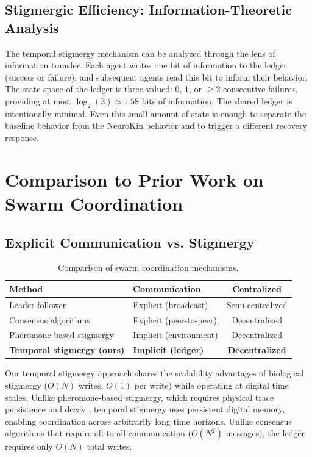 \documentclass[12pt,a4paper,oneside]{report}
\begin{document}
\subsection{Stigmergic Efficiency: Information-Theoretic Analysis}

The temporal stigmergy mechanism can be analyzed through the lens of information transfer. Each agent writes one bit of information to the ledger (success or failure), and subsequent agents read this bit to inform their behavior. The state space of the ledger is three-valued: 0, 1, or $\geq$2 consecutive failures, providing at most $\log_2(3) \approx 1.58$ bits of information. The shared ledger is intentionally minimal. Even this small amount of state is enough to separate the baseline behavior from the NeuroKin behavior and to trigger a different recovery response.

\section{Comparison to Prior Work on Swarm Coordination}

\subsection{Explicit Communication vs. Stigmergy}

\begin{table}[H]
\centering
\caption{Comparison of swarm coordination mechanisms.}
\label{tab:swarm_comparison_lit}
\small
\begin{tabular}{p{5.0cm}p{5.0cm}c}
\toprule
\textbf{Method} & \textbf{Communication} & \textbf{Centralized} \\
\midrule
Leader-follower & Explicit (broadcast) & Semi-centralized \\
Consensus algorithms & Explicit (peer-to-peer) & Decentralized \\
Pheromone-based stigmergy & Implicit (environment) & Decentralized \\
\textbf{Temporal stigmergy (ours)} & \textbf{Implicit (ledger)} & \textbf{Decentralized} \\
\bottomrule
\end{tabular}
\end{table}

Our temporal stigmergy approach shares the scalability advantages of biological stigmergy ($O(N)$ writes, $O(1)$ per write) while operating at digital time scales. Unlike pheromone-based stigmergy, which requires physical trace persistence and decay \cite{bongard2006resilient}, temporal stigmergy uses persistent digital memory, enabling coordination across arbitrarily long time horizons. Unlike consensus algorithms that require all-to-all communication ($O(N^2)$ messages), the ledger requires only $O(N)$ total writes.
\end{document}
